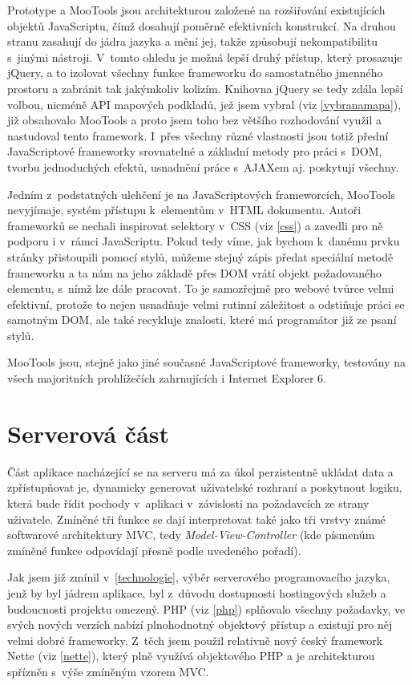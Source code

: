 Prototype a MooTools jsou architekturou založené na rozšiřování
existujících objektů JavaScriptu, čímž dosahují poměrně
efektivních konstrukcí. Na druhou stranu zasahují do jádra
jazyka a mění jej, takže způsobují nekompatibilitu s~jinými nástroji.
V~tomto ohledu je možná lepší druhý přístup, který prosazuje jQuery, a
to izolovat všechny funkce frameworku do samostatného jmenného
prostoru a zabránit tak jakýmkoliv kolizím. Knihovna jQuery se tedy
zdála lepší volbou, nicméně API mapových podkladů, jež jsem vybral
(viz \ref{vybranamapa}), již obsahovalo MooTools a proto jsem toho
bez většího rozhodování využil a nastudoval tento framework. I~přes
všechny různé vlastnosti jsou totiž přední JavaScriptové frameworky
srovnatelné a základní metody pro práci s~DOM, tvorbu jednoduchých
efektů, usnadnění práce s~AJAXem aj. poskytují všechny.

Jedním z~podstatných ulehčení je na JavaScriptových frameworcích,
MooTools nevyjímaje, systém přístupu k~elementům v~HTML dokumentu.
Autoři frameworků se nechali inspirovat selektory v~CSS (viz
\ref{css}) a zavedli pro ně podporu i v~rámci JavaScriptu. Pokud tedy víme, jak bychom
k~danému prvku stránky přistoupili pomocí stylů, můžeme stejný zápis
předat speciální metodě frameworku a ta nám na jeho základě přes DOM
vrátí objekt požadovaného elementu, s~nímž lze dále pracovat. To je
samozřejmě pro webové tvůrce velmi efektivní, protože to nejen usnadňuje velmi rutinní
záležitost a odstiňuje práci se samotným DOM, ale také recykluje
znalosti, které má programátor již ze psaní stylů.

MooTools jsou, stejně jako jiné současné JavaScriptové frameworky,
testovány na všech majoritních prohlížečích zahrnujících i Internet
Explorer 6.

\section{Serverová část}\label{mvc}
Část aplikace nacházející se na serveru má za úkol perzistentně
ukládat data a zpřístupňovat je, dynamicky generovat uživatelské
rozhraní a poskytnout logiku, která bude řídit pochody v~aplikaci
v~závislosti na požadavcích ze strany uživatele. Zmíněné tři funkce se
dají interpretovat také jako tři vrstvy známé softwarové architektury
MVC, tedy {\it Model-View-Controller} (kde písmenům zmíněné funkce
odpovídají přesně podle uvedeného pořadí). \cite{janTichy}

Jak jsem již zmínil v~\ref{technologie}, výběr serverového
programovacího jazyka, jenž by byl jádrem aplikace, byl z~důvodu
dostupnosti hostingových služeb a budoucnosti projektu omezený. PHP
(viz \ref{php}) splňovalo všechny požadavky, ve svých nových verzích
nabízí plnohodnotný objektový přístup a existují pro něj velmi dobré
frameworky. Z~těch jsem použil relativně nový český framework Nette
(viz \ref{nette}), který plně využívá objektového PHP a je
architekturou spřízněn s~výše zmíněným vzorem MVC.

